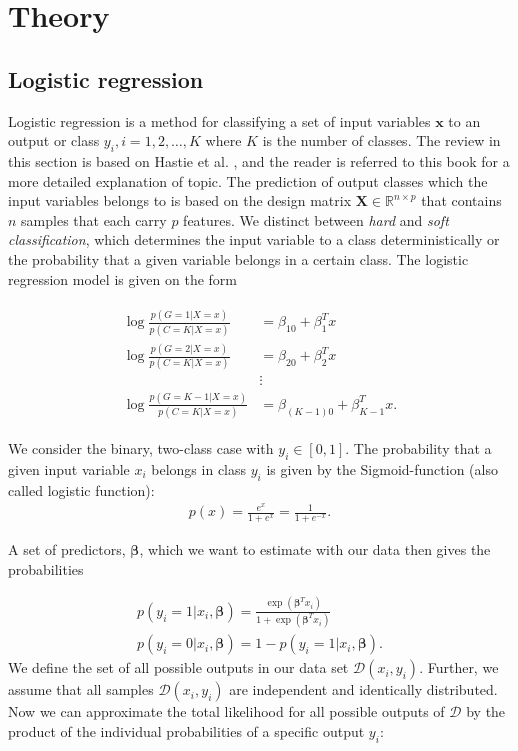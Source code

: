 \documentclass[../main.tex]{subfiles}
\begin{document}
\section{Theory}
\subsection{Logistic regression}
Logistic regression is a method for classifying a set of input variables \ensuremath{\boldsymbol{x}} to an output or class \ensuremath{y_i, i=1,2, \ldots,K} where $K$ is the number of classes. The review in this section is based on Hastie et al. \cite[ch.~4]{HastieTrevor2009EoSL},  and the reader is referred to this book for a more detailed explanation of topic. The prediction of output classes which the input variables belongs to is based on the design matrix \ensuremath{\boldsymbol{X}\in\mathbb{R}^{n\times p}} that contains $n$ samples that each carry $p$ features. We distinct between \textit{hard} and \textit{soft classification}, which determines the input variable to a class deterministically or the probability that a given variable belongs in a certain class. The logistic regression model is given on the form
 
\begin{align}
    \begin{split}
        \log\frac{p(G=1|X=x)}{p(C=K|X=x)}&=\beta_{10}+\beta_1^Tx \\
        \log\frac{p(G=2|X=x)}{p(C=K|X=x)}&=\beta_{20}+\beta_2^Tx \\
        &\vdots\\ 
        \log\frac{p(G=K-1|X=x)}{p(C=K|X=x)}&=\beta_{(K-1)0}+\beta_{K-1}^Tx.
    \end{split}
\end{align}

We consider the binary, two-class case with \ensuremath{y_i \in [0,1]}. The probability that a given input variable $x_i$ belongs in class $y_i$ is given by the Sigmoid-function (also called logistic function):
\begin{align}
    p(x) = \frac{e^x}{1+e^x}=\frac{1}{1+e^{-x}}.
\end{align}

A set of predictors, \ensuremath{\boldsymbol{\beta}}, which we want to estimate with our data then gives the probabilities 

\begin{align}
    p(y_i=1|x_i,\boldsymbol{\beta})=\frac{\exp\left(\boldsymbol{\beta}^Tx_i\right)}{1+\exp\left(\boldsymbol{\beta}^Tx_i\right)} \\
    p(y_i=0|x_i,\boldsymbol{\beta})=1-p(y_i=1|x_i,\boldsymbol{\beta}).
\end{align} We define the set of all possible outputs in our data set \ensuremath{\mathcal{D}(x_i,y_i)}. Further, we assume that all samples \ensuremath{\mathcal{D}(x_i,y_i)} are independent and identically distributed. Now we can approximate the total likelihood for all possible outputs of \ensuremath{\mathcal{D}} by the product of the individual probabilities \cite[p.~120]{HastieTrevor2009EoSL} of a specific output $y_i$:
\end{document}
